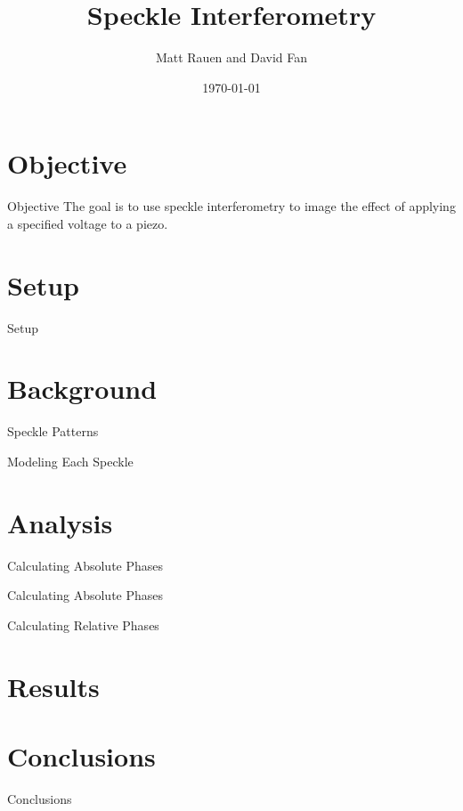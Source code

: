 \documentclass[pdf]{beamer}
\title{Speckle Interferometry}
\author{Matt Rauen and David Fan}
\date{\today}
\begin{document}
\begin{frame}
\titlepage
\end{frame}

\section{Objective}
\begin{frame}{Objective}
The goal is to use speckle interferometry to image the effect of applying a specified voltage to a piezo.
\end{frame}

\section{Setup}
\begin{frame}{Setup}

\end{frame}

\section{Background}
\begin{frame}{Speckle Patterns}

\end{frame}

\begin{frame}{Modeling Each Speckle}

\end{frame}

\section{Analysis}
\begin{frame}{Calculating Absolute Phases}

\end{frame}

\begin{frame}{Calculating Absolute Phases}

\end{frame}

\begin{frame}{Calculating Relative Phases}

\end{frame}

\section{Results}
\begin{frame}

\end{frame}

\section{Conclusions}
\begin{frame}{Conclusions}

\end{frame}
\end{document}
